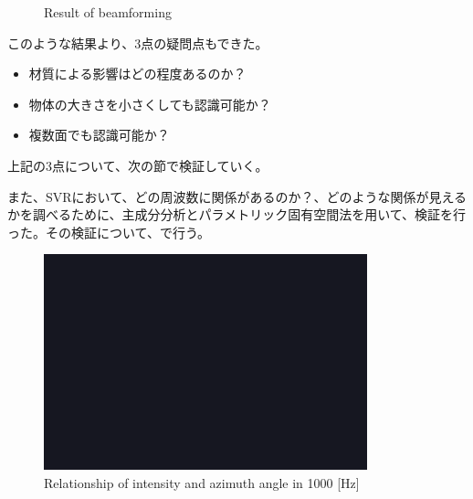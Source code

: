 \begin{figure}[ht]
    \centering
    \caption{Result of beamforming}
    \label{fig:beam_check}
\end{figure}


このような結果より、3点の疑問点もできた。
\begin{itemize}
    \item 材質による影響はどの程度あるのか？
    \item 物体の大きさを小さくしても認識可能か？
    \item 複数面でも認識可能か？
\end{itemize}
上記の3点について、次の節で検証していく。

また、SVRにおいて、どの周波数に関係があるのか？、どのような関係が見えるかを調べるために、主成分分析とパラメトリック固有空間法を用いて、検証を行った。その検証について、で行う。

\begin{figure}[ht]
  \begin{center}
  \vspace{1zh}
    \includegraphics[width=0.5\linewidth]{images/fig_sample.png}   
  \end{center}
  \caption{Relationship of intensity and azimuth angle in 1000 [Hz]}
  \label{fig:relation_intensity_azimuth}
\end{figure}
\fi


